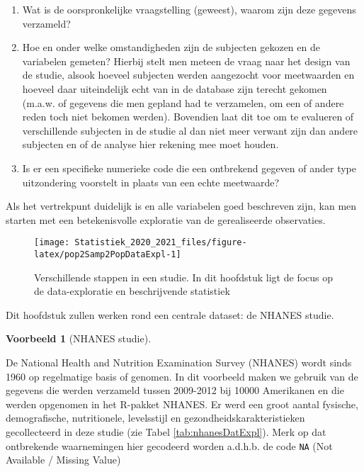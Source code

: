 \documentclass[
  12pt,dutch,coursenotes]{book}
\providecommand{\tightlist}{%
  \setlength{\itemsep}{0pt}\setlength{\parskip}{0pt}}
\theoremstyle{definition}
\theoremstyle{definition}
\newtheorem{example}{Voorbeeld}[chapter]
\theoremstyle{definition}
\theoremstyle{remark}
\begin{document}
\begin{enumerate}
\def\labelenumi{\arabic{enumi}.}
\tightlist
\item
  Wat is de oorspronkelijke vraagstelling (geweest), waarom zijn deze
  gegevens verzameld?
\item
  Hoe en onder welke omstandigheden zijn de subjecten gekozen en de variabelen gemeten? Hierbij stelt men meteen de vraag naar het design van de studie, alsook hoeveel subjecten werden aangezocht voor meetwaarden en hoeveel daar uiteindelijk echt van in de database zijn terecht gekomen (m.a.w. of gegevens die men gepland had te verzamelen, om een of andere reden toch niet bekomen werden). Bovendien laat dit toe om te evalueren of verschillende subjecten in de studie al dan niet meer verwant zijn dan andere subjecten en of de analyse hier rekening mee moet houden.
\item
  Is er een specifieke numerieke code die een ontbrekend gegeven of
  ander type uitzondering voorstelt in plaats van een echte meetwaarde?
\end{enumerate}

Als het vertrekpunt duidelijk is en alle variabelen goed beschreven zijn,
kan men starten met een betekenisvolle exploratie van de gerealiseerde
observaties.

\begin{figure}

{\centering \texttt{[image: Statistiek\_2020\_2021\_files/figure-latex/pop2Samp2PopDataExpl-1]} 

}

\caption{Verschillende stappen in een studie. In dit hoofdstuk ligt de focus op de data-exploratie en beschrijvende statistiek}\label{fig:pop2Samp2PopDataExpl}
\end{figure}

Dit hoofdstuk zullen werken rond een centrale dataset: de NHANES studie.

\begin{example}[NHANES studie]
\protect\hypertarget{exm:nhanesEx}{}{\label{exm:nhanesEx} \iffalse (NHANES studie) \fi{} }
\end{example}

De National Health and Nutrition Examination Survey
(NHANES) wordt sinds 1960 op regelmatige basis of genomen. In dit voorbeeld maken we gebruik van de gegevens die werden verzameld tussen 2009-2012 bij 10000 Amerikanen en die werden opgenomen in het R-pakket NHANES. Er werd een groot aantal fysische, demografische, nutritionele, levelsstijl en gezondheidskarakteristieken gecollecteerd in deze studie (zie Tabel \ref{tab:nhanesDatExpl}). Merk op dat ontbrekende waarnemingen hier gecodeerd worden a.d.h.b. de code \texttt{NA} (Not Available / Missing Value)
\end{document}
